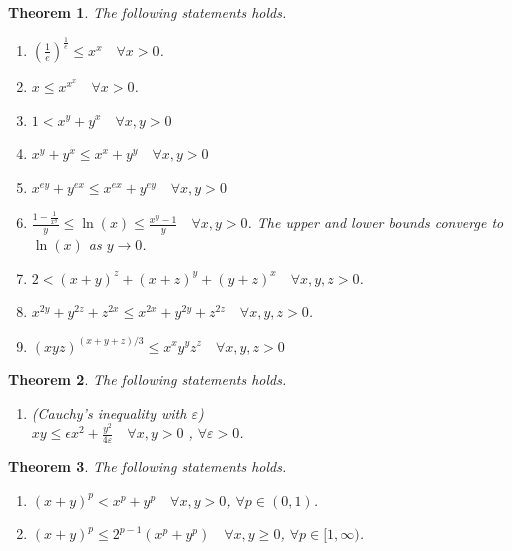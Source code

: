 \documentclass[11pt,a4paper]{report}
\newtheorem{theorem}{Theorem}[section]
\theoremstyle{definition}
\begin{document}
\begin{theorem}
	The following statements holds.
	\begin{enumerate}[label=(\alph*)] 
		\rm\item $\displaystyle \left(\frac{1}{e}\right)^{\frac{1}{e}} \leq x^{x} \quad \forall x > 0$.
		\rm\item $\displaystyle x \leq x^{x^{x}} \quad \forall x > 0$.
		\rm\item $1 < x^{y}+y^{x}  \quad \forall x, y > 0$
		\rm\item $x^{y}+y^{x} \leq x^{x}+y^{y} \quad \forall x, y > 0$
		\rm\item $x^{e y}+y^{e x} \leq x^{e x}+y^{e y} \quad \forall x, y > 0$
		\rm\item $\displaystyle \frac{1-\frac{1}{x^{y}}}{y} \leq \ln (x) \leq \frac{x^{y} - 1}{y} \quad \forall x, y > 0$. The upper and lower bounds converge to $\ln (x)$ as $y \rightarrow 0$.
		\rm\item $2 < (x+y)^{z}+(x+z)^{y}+(y+z)^{x} \quad \forall x, y, z > 0$.
		\rm\item $x^{2 y}+y^{2 z}+z^{2 x} \leq x^{2 x}+y^{2 y}+z^{2 z} \quad \forall x, y, z > 0$.
		\rm\item $(x y z)^{(x+y+z) / 3} \leq x^{x} y^{y} z^{z} \quad \forall x, y, z > 0$
	\end{enumerate}
	
\end{theorem}

\begin{theorem}
	The following statements holds.
	\begin{enumerate}[label=(\alph*)] 
		\rm\item (Cauchy's inequality with $\varepsilon$)\\[0.1cm]
		$\displaystyle xy \leq \epsilon x^{2}+\frac{y^{2}}{4 \varepsilon} \quad \forall x, y>0$ , $\forall \varepsilon>0$.
	\end{enumerate}
\end{theorem}

\begin{theorem}
	The following statements holds.
	\begin{enumerate}[label=(\alph*)] 
		\rm\item $(x+y)^{p} < x^{p}+y^{p} \quad \forall x, y > 0$, $\forall p \in (0, 1)$.
		\rm\item $(x + y)^{p} \leq 2^{p - 1}\left(x^{p} + y^{p}\right) \quad \forall x, y \geq 0$, $\forall p \in [1, \infty)$.
	\end{enumerate}
\end{theorem}
\end{document}
